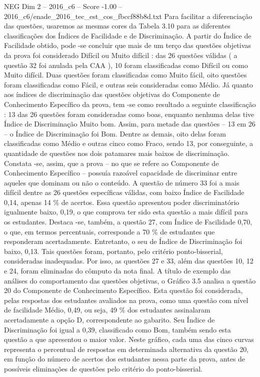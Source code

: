 \begin{textsample}{NEG Dim 2 – 2016\_c6 – Score -1.00 – 2016\_c6/enade\_2016\_tec\_est\_cos\_fbccf88b8d.txt}
Para facilitar a diferenciação das questões, usaremos as mesmas cores da Tabela 3.10 para as diferentes classificações dos Índices de Facilidade e de Discriminação.
A partir do Índice de Facilidade obtido, pode -se concluir que mais de um terço das questões objetivas da prova foi considerado Difícil ou Muito difícil : das 26 questões válidas ( a questão 32 foi anulada pela CAA ), 10 foram classificadas como Difícil ou como Muito difícil.
Duas questões foram classificadas como Muito fácil, oito questões foram classificadas como Fácil, e outras seis consideradas como Médio.
Já quanto aos índices de discriminação das questões objetivas do Componente de Conhecimento Específico da prova, tem -se como resultado a seguinte classificação : 13 das 26 questões foram consideradas como boas, enquanto nenhuma delas tive Índice de Discriminação Muito bom.
Assim, para metade das questões – 13 em 26 – o Índice de Discriminação foi Bom.
Dentre as demais, oito delas foram classificadas como Médio e outras cinco como Fraco, sendo 13, por conseguinte, a quantidade de questões nos dois patamares mais baixos de discriminação.
Constata -se, assim, que a prova – no que se refere ao Componente de Conhecimento Específico – possuía razoável capacidade de discriminar entre aqueles que dominam ou não o conteúdo.
A questão de número 33 foi a mais difícil dentre as 26 questões específicas válidas, com baixo Índice de Facilidade 0,14, apenas 14 \% de acertos.
Essa questão apresentou poder discriminatório igualmente baixo, 0,19, o que comprova ter sido esta questão a mais difícil para os estudantes.
Destaca -se, também, a questão 27, com Índice de Facilidade 0,70, o que, em termos percentuais, corresponde a 70 \% de estudantes que responderam acertadamente.
Entretanto, o seu de Índice de Discriminação foi baixo, 0,13.
Tais questões foram, portanto, pelo critério ponto-bisserial, consideradas inadequadas.
Por isso, as questões 27 e 33, além das questões 10, 12 e 24, foram eliminadas do cômputo da nota final.
A título de exemplo das análises do comportamento das questões objetivas, o Gráfico 3.5 analisa a questão 20 do Componente de Conhecimento Específico.
Esta questão foi considerada, pelas respostas dos estudantes avaliados na prova, como uma questão com nível de facilidade Médio, 0,49, ou seja, 49 \% dos estudantes assinalaram acertadamente a opção D, correspondente ao gabarito.
Seu Índice de Discriminação foi igual a 0,39, classificado como Bom, também sendo esta questão a que apresentou o maior valor.
Neste gráfico, cada uma das cinco curvas representa o percentual de respostas em determinada alternativa da questão 20, em função do número de acertos dos estudantes nessa parte da prova, antes de possíveis eliminações de questões pelo critério do ponto-bisserial.

\end{textsample}
